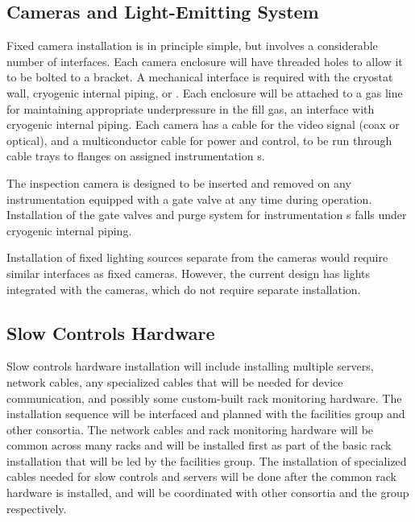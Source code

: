 \subsection{Cameras and Light-Emitting System}
\label{sec:fdgen-slow-cryo-install-c}

Fixed camera installation is in principle simple, but involves a
considerable number of interfaces. Each camera enclosure will have
threaded holes to allow it to be bolted to a bracket. A mechanical
interface is required with the cryostat wall, cryogenic internal
piping, or . Each enclosure will be attached
to a gas line for maintaining appropriate underpressure in the fill
gas, an interface with cryogenic internal piping. Each camera has a
cable for the video signal (coax or optical), and a multiconductor
cable for power and control, to be run through cable trays to flanges
on assigned instrumentation \fdth{}s.

The inspection camera is designed to be inserted and removed on any
instrumentation \fdth equipped with a gate valve at any time
during operation.  Installation of the gate valves and purge system
for instrumentation \fdth{}s falls under cryogenic internal
piping.

Installation of fixed lighting sources separate from the cameras would
require similar interfaces as fixed cameras.  However, the current
design has lights integrated with the cameras, which do not require separate
installation.



\subsection{Slow Controls Hardware}
\label{sec:fdgen-slow-cryo-install-sc-hard}

Slow controls hardware installation will include installing multiple
servers, network cables, any specialized cables that will be needed
for device communication, and possibly some custom-built rack
monitoring hardware. The installation sequence will be interfaced and
planned with the facilities group and other consortia. The network
cables and rack monitoring hardware will be common across many racks
and will be installed first as part of the basic rack installation
that will be led by the facilities group. The installation of
specialized cables needed for slow controls and servers will be done
after the common rack hardware is installed, and will be coordinated
with other consortia and the  group respectively.

